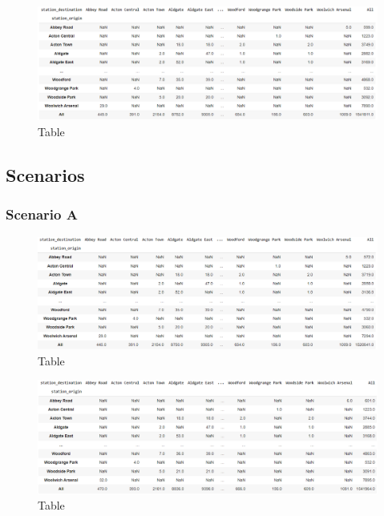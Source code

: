 \documentclass[10pt]{report}
\numberwithin{figure}{section}
\numberwithin{table}{section}
\begin{document}
    \begin{figure}[htp]
        \centering
        \includegraphics[width=16cm]{Image/Part2_OD2.png}
        \caption{Table}
        \label{fig:galaxy}
    \end{figure}

\newpage    
\subsection{Scenarios}
\subsubsection{Scenario A}

    \begin{figure}[htp]
        \centering
        \includegraphics[width=16cm]{Image/Part2_OD3_scenario A.png}
        \caption{Table}
        \label{fig:galaxy}
    \end{figure}

    \begin{figure}[htp]
        \centering
        \includegraphics[width=16cm]{Image/Part2_OD4_scenario A.png}
        \caption{Table}
        \label{fig:galaxy}
    \end{figure}
\end{document}
